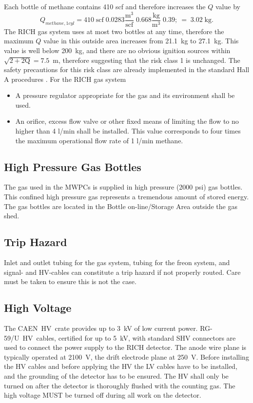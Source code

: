 \begin{safetyen}{0}{0}
Each bottle of methane contains 410 scf and therefore increases the $Q$ value by
\begin{equation}
Q_{methane,1cyl} = 410 \; \mbox{scf} \; 0.0283 \frac{\mbox{m}^3}{\mbox{scf}} \; 0.668 \frac{\mbox{kg}}{\mbox{m}^3} \; 0.39 ;\ = \; 3.02 \; \mbox{kg}.
\end{equation}
The RICH gas system uses at most two bottles at any time, therefore the maximum $Q$ value in
this outside area increases  from 21.1~kg to 27.1~kg. This value is well below 200~kg, and 
there are no obvious ignition sources within $\sqrt{2 + 2 \mbox{Q}} = 7.5$~m, therefore
suggesting that the risk class 1 is unchanged. The safety precautions for this risk class
are already implemented in the standard Hall A procedures \cite{Hawgswww}. For the RICH gas system
\begin{itemize}

\item A pressure regulator appropriate for the gas and its environment shall be used. 
 
\item An orifice, excess flow valve or other fixed means of limiting the flow to no higher
than 4 l/min shall be installed. This value corresponds to four times the maximum
operational flow rate of 1 l/min methane.

\end{itemize}

\subsection{High Pressure Gas Bottles} The gas used in the MWPCs is supplied in high pressure (2000 psi) 
gas bottles. This confined high pressure gas represents a tremendous amount of stored energy. 
The gas bottles are located  in the Bottle on-line/Storage Area outside the gas shed.

\subsection{Trip Hazard} Inlet and outlet tubing for the gas system, tubing for the freon system,
and signal- and HV-cables can constitute a trip hazard if not 
properly routed. Care must be taken to ensure this is not the case. 

\subsection{High Voltage} The CAEN~HV~crate
provides up to 3~kV of low current power.
RG-59/U~HV~cables, certified for up to 5~kV, with standard SHV 
connectors are used to connect the power supply to the RICH detector.
The anode wire plane is typically operated at 2100~V, the 
drift electrode plane at 250~V.
Before installing the HV cables and before applying the HV the 
LV cables have to be installed, and the grounding of the detector 
has to be ensured. The HV shall only be turned on after the 
detector is thoroughly flushed with the counting gas.
The high voltage MUST be turned off during all work on the detector.

\end{safetyen}

